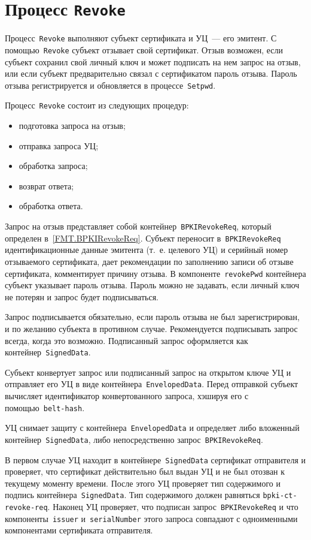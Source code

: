 \section{Процесс \texttt{Revoke}}\label{PROCESSES.Revoke}

Процесс~\texttt{Revoke} выполняют субъект сертификата и УЦ~---
его эмитент. С помощью~\texttt{Revoke} субъект отзывает свой сертификат.
Отзыв возможен, если субъект сохранил свой личный ключ и может подписать 
на нем запрос на отзыв, или если субъект предварительно связал с 
сертификатом пароль отзыва. Пароль отзыва регистрируется и обновляется
в процессе~\texttt{Setpwd}.

Процесс~\texttt{Revoke} состоит из следующих процедур:
\begin{itemize}
\item
подготовка запроса на отзыв;
\item
отправка запроса УЦ;
\item
обработка запроса;
\item
возврат ответа;
\item
обработка ответа.
\end{itemize}

Запрос на отзыв представляет собой контейнер~\texttt{BPKIRevokeReq},
который определен в~\ref{FMT.BPKIRevokeReq}. Субъект переносит 
в~\texttt{BPKIRevokeReq} идентификационные данные эмитента (т.~е. целевого 
УЦ) и серийный номер отзываемого сертификата, дает рекомендации по 
заполнению записи об отзыве сертификата, комментирует причину отзыва. В 
компоненте~\texttt{revokePwd} контейнера субъект указывает пароль отзыва. 
Пароль можно не задавать, если личный ключ не потерян и запрос будет 
подписываться.

Запрос подписывается обязательно, если пароль отзыва не был 
зарегистрирован, и по желанию субъекта в противном случае.
%
Рекомендуется подписывать запрос всегда, когда это возможно.
%
Подписанный запрос оформляется как контейнер~\texttt{SignedData}.

Субъект конвертует запрос или подписанный запрос на открытом ключе УЦ
и отправляет его УЦ в виде контейнера~\texttt{EnvelopedData}.
Перед отправкой субъект вычисляет идентификатор конвертованного запроса,
хэшируя его с помощью~\texttt{belt-hash}.

УЦ снимает защиту с контейнера~\texttt{EnvelopedData} и определяет 
либо вложенный контейнер~\texttt{SignedData}, либо непосредственно
запрос~\texttt{BPKIRevokeReq}.

В первом случае УЦ находит в контейнере~\texttt{SignedData}
сертификат отправителя и проверяет, что сертификат действительно 
был выдан УЦ и не был отозван к текущему моменту времени. 
После этого УЦ проверяет тип содержимого и подпись 
контейнера~\texttt{SignedData}. Тип содержимого должен равняться 
\texttt{bpki-ct-revoke-req}. Наконец УЦ проверяет, что  подписан 
запрос~\texttt{BPKIRevokeReq} и что компоненты~\texttt{issuer} 
и~\texttt{serialNumber} этого запроса совпадают с одноименными 
компонентами сертификата отправителя.

